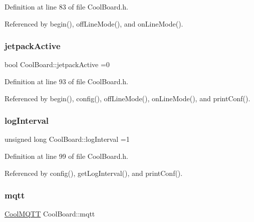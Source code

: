 Definition at line 83 of file Cool\+Board.\+h.



Referenced by begin(), off\+Line\+Mode(), and on\+Line\+Mode().

\mbox{\label{classCoolBoard_a9be03a913d26e558328935ca3b59a75e}} 
\subsubsection{\texorpdfstring{jetpack\+Active}{jetpackActive}}
{\footnotesize\ttfamily bool Cool\+Board\+::jetpack\+Active =0\hspace{0.3cm}{\ttfamily [private]}}



Definition at line 93 of file Cool\+Board.\+h.



Referenced by begin(), config(), off\+Line\+Mode(), on\+Line\+Mode(), and print\+Conf().

\mbox{\label{classCoolBoard_a84bc94413b64973e4aba8c467c97006c}} 
\subsubsection{\texorpdfstring{log\+Interval}{logInterval}}
{\footnotesize\ttfamily unsigned long Cool\+Board\+::log\+Interval =1\hspace{0.3cm}{\ttfamily [private]}}



Definition at line 99 of file Cool\+Board.\+h.



Referenced by config(), get\+Log\+Interval(), and print\+Conf().

\mbox{\label{classCoolBoard_a2399f44d7c23c1149a335cb3b46d90f1}} 
\subsubsection{\texorpdfstring{mqtt}{mqtt}}
{\footnotesize\ttfamily \hyperlink{classCoolMQTT}{Cool\+M\+Q\+TT} Cool\+Board\+::mqtt\hspace{0.3cm}{\ttfamily [private]}}




